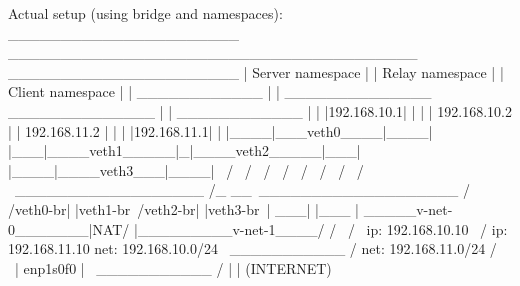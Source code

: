 \begin{myverbatim}

Actual setup (using bridge and namespaces):
 ______________________         _______________________________________        ______________________
|   Server namespace   |       |            Relay namespace            |      |   Client namespace   |
|     ____________     |       |    ______________   ______________    |      |     ____________     |
|    |192.168.10.1|    |       |   | 192.168.10.2 | | 192.168.11.2 |   |      |    |192.168.11.1|    |
|____|___veth0____|____|       |___|____veth1_____|_|____veth2_____|___|      |____|____veth3___|____|
            \                            /                 \                             /
             \                          /                   \                           /
              \                        /                     \                         /
               \                      /                       \                       /
                \ __________________ /_                      __\ ___________________ /
                /veth0-br|     |veth1-br\                   /veth2-br|      |veth3-br\
                |                    ___|                   |___                     |
                \_____v-net-0_______|NAT/                   \NAT|_________v-net-1____/
                        /              \                     /                \
                ip: 192.168.10.10       \                   /         ip: 192.168.11.10
                net: 192.168.10.0/24     \   ___________   /          net: 192.168.11.0/24
                                           /             \
                                          |   enp1s0f0    |
                                           \ ___________ /
                                                  |
                                                  |
                                              (INTERNET)

\end{myverbatim}